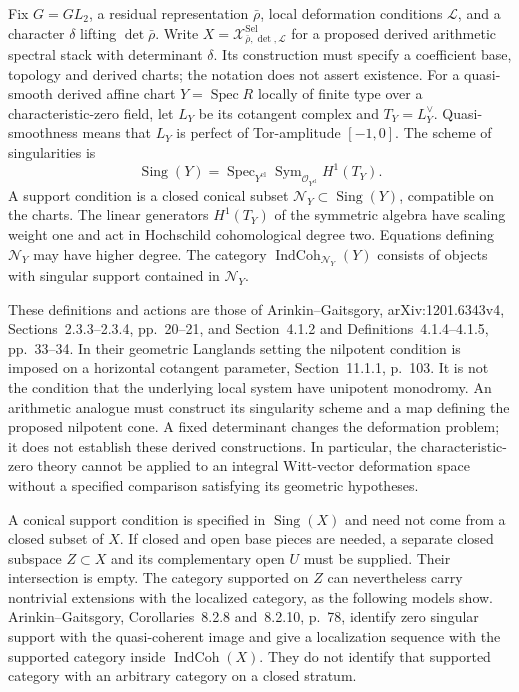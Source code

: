 \begin{definition}
\label{v4-arith:w5-h:def:det-cleavage}
Fix $G=GL_2$, a residual representation $\bar\rho$, local deformation
conditions $\mathcal L$, and a character $\delta$ lifting
$\det\bar\rho$. Write
$X=\mathcal X^{\mathrm{Sel}}_{\bar\rho,\det,\mathcal L}$ for a
proposed derived arithmetic spectral stack with determinant $\delta$.
Its construction must specify a coefficient base, topology and derived
charts; the notation does not assert existence.
For a quasi-smooth derived affine chart $Y=\operatorname{Spec}R$ locally
of finite type over a characteristic-zero field, let $L_Y$ be its
cotangent complex and $T_Y=L_Y^\vee$. Quasi-smoothness means that $L_Y$
is perfect of Tor-amplitude $[-1,0]$. The scheme of singularities is
\begin{equation}
\label{v4-arith:w5-h:eq:det-cleavage}
 \operatorname{Sing}(Y)=\operatorname{Spec}_{Y^{\mathrm{cl}}}
 \operatorname{Sym}_{\mathcal O_{Y^{\mathrm{cl}}}} H^1(T_Y).
\end{equation}
A support condition is a closed conical subset
$\mathcal N_Y\subset\operatorname{Sing}(Y)$, compatible on the charts.
The linear generators $H^1(T_Y)$ of the symmetric algebra have
scaling weight one and act in Hochschild cohomological degree two.
Equations defining $\mathcal N_Y$ may have higher degree.
The category $\operatorname{IndCoh}_{\mathcal N_Y}(Y)$ consists of
objects with singular support contained in $\mathcal N_Y$.
\end{definition}

These definitions and actions are those of Arinkin--Gaitsgory,
arXiv:1201.6343v4, Sections~2.3.3--2.3.4, pp.~20--21, and
Section~4.1.2 and Definitions~4.1.4--4.1.5, pp.~33--34.
In their geometric Langlands setting the nilpotent condition is imposed
on a horizontal cotangent parameter, Section~11.1.1, p.~103.
It is not the condition that the underlying local system have unipotent
monodromy. An arithmetic analogue must construct its singularity scheme
and a map defining the proposed nilpotent cone. A fixed determinant
changes the deformation problem; it does not establish these derived
constructions. In particular, the characteristic-zero theory cannot be
applied to an integral Witt-vector deformation space without a specified
comparison satisfying its geometric hypotheses.

A conical support condition is specified in $\operatorname{Sing}(X)$
and need not come from a closed subset of $X$. If closed
and open base pieces are needed, a separate closed subspace $Z\subset X$
and its complementary open $U$ must be supplied. Their intersection is
empty. The category supported on $Z$ can nevertheless carry nontrivial
extensions with the localized category, as the following models show.
Arinkin--Gaitsgory, Corollaries~8.2.8 and~8.2.10, p.~78, identify zero
singular support with the quasi-coherent image and give a localization
sequence with the supported category inside $\operatorname{IndCoh}(X)$.
They do not identify that supported category with an arbitrary category
on a closed stratum.

